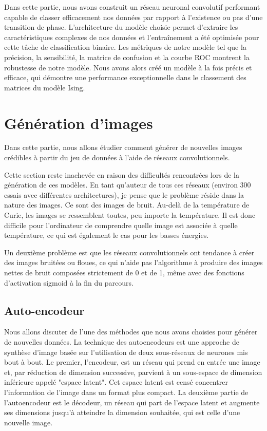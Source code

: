 \documentclass[11pt, parskip=half]{scrartcl} %
\begin{document}
\begin{figure}[h]

\end{figure}

Dans cette partie, nous avons construit un réseau neuronal convolutif performant capable de classer efficacement nos données par rapport à l’existence ou pas d’une transition de phase. L’architecture du modèle choisie permet d’extraire les caractéristiques complexes de nos données et l’entraînement a été optimisée pour cette tâche de classification binaire. Les métriques de notre modèle tel que la précision, la sensibilité, la matrice de confusion et la courbe ROC montrent la robustesse de notre modèle. Nous avons alors créé un modèle à la fois précis et efficace, qui démontre une performance exceptionnelle dans le classement des matrices du modèle Ising.

\section{Génération d'images}
Dans cette partie, nous allons étudier comment générer de nouvelles images crédibles à partir du jeu de données à l'aide de réseaux convolutionnels.

Cette section reste inachevée en raison des difficultés rencontrées lors de la génération de ces modèles. En tant qu'auteur de tous ces réseaux (environ 300 essais avec différentes architectures), je pense que le problème réside dans la nature des images. Ce sont des images de bruit. Au-delà de la température de Curie, les images se ressemblent toutes, peu importe la température. Il est donc difficile pour l'ordinateur de comprendre quelle image est associée à quelle température, ce qui est également le cas pour les basses énergies.

Un deuxième problème est que les réseaux convolutionnels ont tendance à créer des images bruitées ou floues, ce qui n'aide pas l'algorithme à produire des images nettes de bruit composées strictement de 0 et de 1, même avec des fonctions d'activation sigmoid à la fin du parcours.

\subsection{Auto-encodeur}
Nous allons discuter de l'une des méthodes que nous avons choisies pour générer de nouvelles données. La technique des autoencodeurs est une approche de synthèse d'image basée sur l'utilisation de deux sous-réseaux de neurones mis bout à bout. Le premier, l'encodeur, est un réseau qui prend en entrée une image et, par réduction de dimension successive, parvient à un sous-espace de dimension inférieure appelé "espace latent". Cet espace latent est censé concentrer l'information de l'image dans un format plus compact. La deuxième partie de l'autoencodeur est le décodeur, un réseau qui part de l'espace latent et augmente ses dimensions jusqu'à atteindre la dimension souhaitée, qui est celle d'une nouvelle image.
\end{document}
